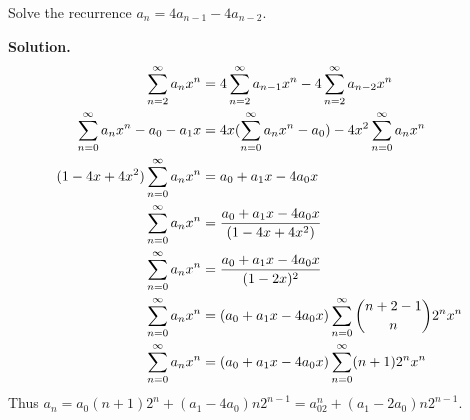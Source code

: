 \documentclass{book}
\begin{document}
\setcounter{project}{270}
\addtocounter{project}{-1}
\begin{activity}[]\label{activity-263}
\hypertarget{p-1434}{}%
Solve the recurrence \(a_n= 4a_{n-1} - 4a_{n-2}\).%
\par\smallskip%
\noindent\textbf{Solution.}\hypertarget{solution-202}{}\quad%
\hypertarget{p-1435}{}%
%
\begin{align*}
\sum_{n=2}^\infty a_nx^n  &=  4\sum_{n=2}^\infty a_{n-1}x^n -
4\sum_{n=2}^\infty a_{n-2}x^n\\
\sum_{n=0}^\infty a_nx^n -a_0-a_1x  &=  4x(\sum_{n=0}^\infty a_{n}x^n
-a_0) - 4x^2\sum_{n=0}^\infty a_{n}x^n\\
(1-4x+4x^2)\sum_{n=0}^\infty a_nx^n   &=
a_0+a_1x-4a_0x\\
\sum_{n=0}^\infty a_nx^n &= \frac{a_0+a_1x-4a_0x}{(1-4x+4x^2)}\\
\sum_{n=0}^\infty a_nx^n &= \frac{a_0+a_1x-4a_0x}{(1-2x)^2}\\
\sum_{n=0}^\infty a_nx^n &= (a_0+a_1x-4a_0x)\sum_{n=0}^\infty \binom{n+2-1}{n}
2^nx^n\\
\sum_{n=0}^\infty a_nx^n &= (a_0+a_1x-4a_0x)\sum_{n=0}^\infty (n+1)
2^nx^n
\end{align*}
Thus \(a_n=a_0(n+1)2^n
+(a_1-4a_0)n2^{n-1}=a_02^n+(a_1-2a_0)n2^{n-1}\).%
\end{activity}
\end{document}
